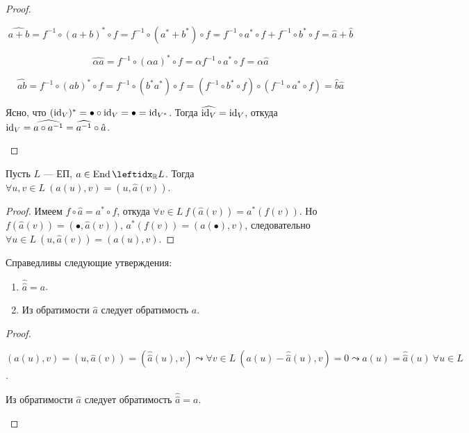 \begin{proof}
    \begin{proofpart}
        $$\widehat{a + b} = f^{-1} \circ (a + b)^* \circ f = f^{-1} \circ (a^* + b^*) \circ f = f^{-1} \circ a^* \circ f + f^{-1} \circ b^* \circ f = \hat{a} + \hat{b}$$
    \end{proofpart}

    \begin{proofpart}
        $$\widehat{\alpha a} = f^{-1} \circ (\alpha a)^* \circ f = \alpha f^{-1} \circ a^* \circ f = \alpha \hat{a}$$
    \end{proofpart}

    \begin{proofpart}
        $$\widehat{ab} = f^{-1} \circ (ab)^* \circ f = f^{-1} \circ (b^* a^*) \circ f = (f^{-1} \circ b^* \circ f) \circ (f^{-1} \circ a^* \circ f) = \hat{b} \hat{a}$$
    \end{proofpart}

    \begin{proofpart}
        Ясно, что $(\operatorname{id}_V)^* = \bullet \circ \operatorname{id}_V = \bullet = \operatorname{id}_{V^*}$. Тогда $\widehat{\operatorname{id}_V} = \operatorname{id}_V$, откуда $\operatorname{id}_V = \widehat{a \circ a^{-1}} = \widehat{a^{-1}} \circ \hat{a}$.
    \end{proofpart}
\end{proof}

\begin{thm}
    Пусть $L$ --- ЕП, $a \in \End \lsub{\mathbb{R}}{L}$. Тогда $\forall u, v \in L\ (a(u), v) = (u, \hat{a}(v))$.
\end{thm}

\begin{proof}
    Имеем $f \circ \hat{a} = a^* \circ f$, откуда $\forall v \in L\ f(\hat{a}(v)) = a^*(f(v))$. Но $f(\hat{a}(v)) = (\bullet, \hat{a}(v))$, $a^*(f(v)) = (a(\bullet), v)$, следовательно $\forall u \in L\ (u, \hat{a}(v)) = (a(u), v)$.
\end{proof}

\begin{cor}
    Справедливы следующие утверждения:
    \begin{enumerate}
        \item $\hat{\hat{a}} = a$.
        \item Из обратимости $\hat{a}$ следует обратимость $a$.
    \end{enumerate}
\end{cor}

\begin{proof}
    \begin{proofpart}
        $(a(u), v) = (u, \hat{a}(v)) = (\hat{\hat{a}}(u), v) \leadsto \forall v \in L\ (a(u) - \hat{\hat{a}}(u), v) = 0 \leadsto a(u) = \hat{\hat{a}}(u)\ \forall u \in L$.
    \end{proofpart}

    \begin{proofpart}
        Из обратимости $\hat{a}$ следует обратимость $\hat{\hat{a}} = a$.
    \end{proofpart}
\end{proof}

